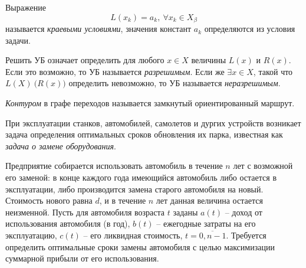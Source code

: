 \begin{definition}
  Выражение
  \[
    L(x_k) = a_k, \ \forall x_k \in X_{\beta } 
  \]
  называется \emph{краевыми условиями}, значения констант $a_k$ определяются из условия задачи.
\end{definition}

\begin{definition}
  Решить УБ означает определить для любого $x \in X$ величины $L(x)$ и $R(x)$. Если это возможно, то УБ называется \emph{разрешимым}. Если же $\exists x \in X$, такой что $L(X) \ \big(R(x)\big)$ определить невозможно, то УБ называется \emph{неразрешимым}.
\end{definition}

\begin{definition}[Контур]
  \emph{Контуром} в графе переходов называется замкнутый ориентированный маршрут.
\end{definition}

\begin{definition}
  При эксплуатации станков, автомобилей, самолетов и дургих устройств возникает задача определения оптимальных сроков обновления их парка, известная как \emph{задача о замене оборудования}.

  Предприятие собирается использовать автомобиль в течение $n$ лет с возможной его заменой: в конце каждого года имеющийся автомобиль либо остается в эксплуатации, либо производится замена старого автомобиля на новый. Стоимость нового равна $d$, и в течение $n$ лет данная величина остается неизменной. Пусть для автомобиля возраста $t$ заданы $a(t)$ -- доход от использования автомобиля (в год), $b (t)$ -- ежегодные затраты на его эксплуатацию, $c(t)$ -- его ликвидная стоимость, $t = \overline{0,n-1} $. Требуется определить оптимальные сроки замены автомобиля с целью максимизации суммарной прибыли от его использования. 
\end{definition}
